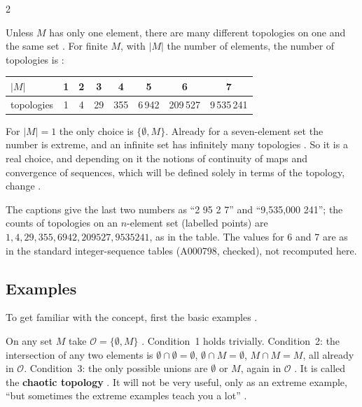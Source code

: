 \begin{paracol}{2}
\begin{remark}\label{rem:to-count}
Unless $M$ has only one element, there are many different topologies on one and the same set .
For finite $M$, with $|M|$ the number of elements, the number of topologies is :
\begin{center}
\begin{tabular}{l|ccccccc}
$|M|$ & 1 & 2 & 3 & 4 & 5 & 6 & 7\\\hline
topologies & 1 & 4 & 29 & 355 & 6\,942 & 209\,527 & 9\,535\,241
\end{tabular}
\end{center}
For $|M|=1$ the only choice is $\{\emptyset,M\}$. Already for a seven-element set the number is extreme, and an infinite
set has infinitely many topologies . So it is a real choice, and depending on it the notions of
continuity of maps and convergence of sequences, which will be defined solely in terms of the topology, change
.
\end{remark}
\begin{coursenote}
The captions give the last two numbers as ``2 95 2 7'' and ``9,535,000 241''; the counts of topologies on an
$n$-element set (labelled points) are $1,4,29,355,6942,209527,9535241$, as in the table. The values for 6 and 7 are
as in the standard integer-sequence tables (A000798, checked), not recomputed here.
\end{coursenote}

\subsection*{Examples}

To get familiar with the concept, first the basic examples .

\begin{example}\label{ex:to-chaotic}
On any set $M$ take $\mathcal O=\{\emptyset,M\}$ . Condition~1 holds trivially. Condition~2: the
intersection of any two elements is $\emptyset\cap\emptyset=\emptyset$, $\emptyset\cap M=\emptyset$, $M\cap M=M$, all
already in $\mathcal O$. Condition~3: the only possible unions are $\emptyset$ or $M$, again in $\mathcal O$
. It is called the \textbf{chaotic topology} . It will not be very useful,
only as an extreme example, ``but sometimes the extreme examples teach you a lot'' .
\end{example}


\end{paracol}
